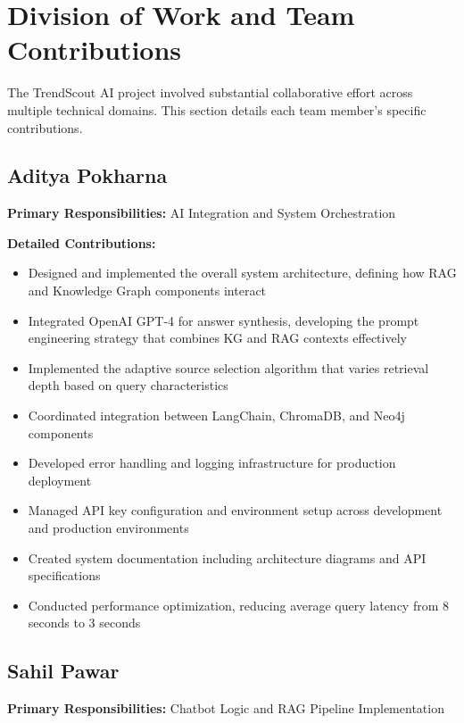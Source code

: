 \documentclass[11pt,twocolumn]{article}
\begin{document}
\section{Division of Work and Team Contributions}

The TrendScout AI project involved substantial collaborative effort across multiple technical domains. This section details each team member's specific contributions.

\subsection{Aditya Pokharna}

\textbf{Primary Responsibilities:} AI Integration and System Orchestration

\textbf{Detailed Contributions:}
\begin{itemize}
\item Designed and implemented the overall system architecture, defining how RAG and Knowledge Graph components interact
\item Integrated OpenAI GPT-4 for answer synthesis, developing the prompt engineering strategy that combines KG and RAG contexts effectively
\item Implemented the adaptive source selection algorithm that varies retrieval depth based on query characteristics
\item Coordinated integration between LangChain, ChromaDB, and Neo4j components
\item Developed error handling and logging infrastructure for production deployment
\item Managed API key configuration and environment setup across development and production environments
\item Created system documentation including architecture diagrams and API specifications
\item Conducted performance optimization, reducing average query latency from 8 seconds to 3 seconds
\end{itemize}

\subsection{Sahil Pawar}

\textbf{Primary Responsibilities:} Chatbot Logic and RAG Pipeline Implementation
\end{document}
